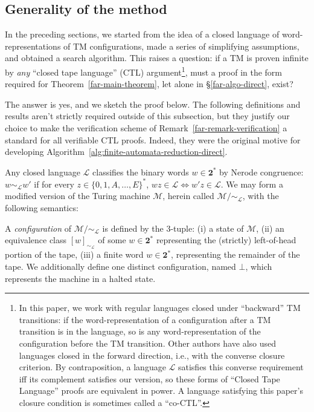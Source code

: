 \subsection{Generality of the method}
In the preceding sections, we started from the idea of a closed language of word-representations of TM configurations, made a series of simplifying assumptions, and obtained a search algorithm.
This raises a question: if a TM is proven infinite by \emph{any} ``closed tape language''  (CTL) argument\footnote{
	In this paper, we work with regular languages closed under ``backward'' TM transitions: if the word-representation of a configuration after a TM transition is in the language, so is any word-representation of the configuration before the TM transition.
	Other authors have also used languages closed in the forward direction, i.e., with the converse closure criterion.
	By contraposition, a language $\mathcal{L}$ satisfies this converse requirement iff its complement satisfies our version, so these forms of ``Closed Tape Language'' proofs are equivalent in power.
	A language satisfying this paper's closure condition is sometimes called a ``co-CTL''.
},
must a proof in the form required for Theorem~\ref{far-main-theorem}, let alone in \S\ref{far-algo-direct}, exist?

The answer is yes, and we sketch the proof below.
The following definitions and results aren't strictly required outside of this subsection, but they justify our choice to make the verification scheme of Remark~\ref{far-remark-verification} a standard for all verifiable CTL proofs.
Indeed, they were the original motive for developing Algorithm~\ref{alg:finite-automata-reduction-direct}.

Any closed language $\mathcal{L}$ classifies the binary words $w\in\mathbf{2}^*$ by Nerode congruence: $w\sim_\mathcal{L} w'$ if for every $z\in\{0,1,A,\ldots,E\}^*$, $wz\in\mathcal{L}\iff w'z\in\mathcal{L}$.
We may form a modified version of the Turing machine $\mathcal{M}$, herein called $\mathcal{M}/\sim_\mathcal{L}$, with the following semantics:

A \textit{configuration} of $\mathcal{M}/\sim_\mathcal{L}$ is defined by the 3-tuple: (i) a state of $\mathcal{M}$, (ii) an equivalence class $[w]_{\sim_\mathcal{L}}$ of some $w\in\mathbf{2}^*$ representing the (strictly) left-of-head portion of the tape,  (iii) a finite word $w\in\mathbf{2}^*$, representing the remainder of the tape.
We additionally define one distinct configuration, named $\bot$, which represents the machine in a halted state.

